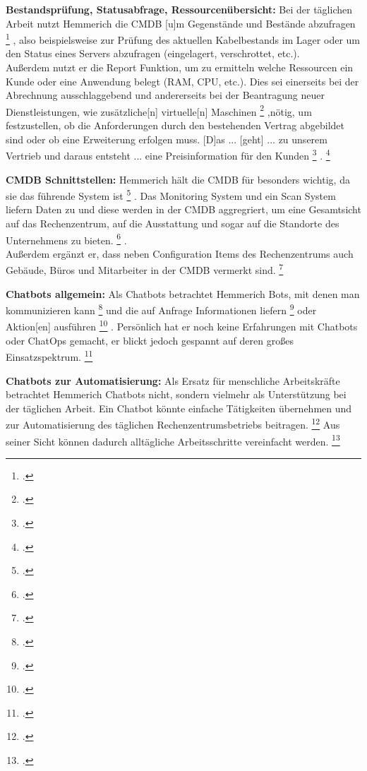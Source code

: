 \textbf{Bestandsprüfung, Statusabfrage, Ressourcenübersicht: }Bei der täglichen Arbeit nutzt Hemmerich die \acs{CMDB} \glqq{}[u]m Gegenstände und Bestände abzufragen\grqq
\footcite[][o. \pno]{Hemm_2019}
, also beispielsweise zur Prüfung des aktuellen Kabelbestands im Lager oder um den Status eines Servers abzufragen (eingelagert, verschrottet, etc.).\\
Außerdem nutzt er die Report Funktion, um zu ermitteln welche Ressourcen ein Kunde oder eine Anwendung belegt (RAM, CPU, etc.). Dies sei einerseits bei der Abrechnung ausschlaggebend und andererseits bei der Beantragung neuer Dienstleistungen, wie \glqq{}zusätzliche[n] virtuelle[n] Maschinen\grqq
\footcite[][o. \pno]{Hemm_2019}
,nötig, um festzustellen, ob die Anforderungen durch den bestehenden Vertrag abgebildet sind oder ob eine Erweiterung erfolgen muss. \glqq{}[D]as ... [geht] ... zu unserem Vertrieb und daraus entsteht ... eine Preisinformation für den Kunden\grqq
\footcite[][o. \pno]{Hemm_2019}
.
\footcite[Vgl.][o. \pno]{Hemm_2019}

\textbf{\acs{CMDB} Schnittstellen: }Hemmerich hält die \acs{CMDB} für besonders wichtig, da sie \glqq{}das führende System ist\grqq
\footcite[][o. \pno]{Hemm_2019}
. Das Monitoring System und ein Scan System liefern Daten zu und diese werden in der CMDB \glqq{}aggregriert, um eine Gesamtsicht auf das Rechenzentrum, auf die Ausstattung und sogar auf die Standorte des Unternehmens zu bieten.\grqq
\footcite[][o. \pno]{Hemm_2019}
.\\
Außerdem ergänzt er, dass neben Configuration Items des Rechenzentrums auch Gebäude, Büros und Mitarbeiter in der \acs{CMDB} vermerkt sind.
\footcite[Vgl.][o. \pno]{Hemm_2019}

\textbf{Chatbots allgemein: }Als Chatbots betrachtet Hemmerich Bots, \glqq{}mit denen man kommunizieren kann\grqq
\footcite[][o. \pno]{Hemm_2019}
und die auf Anfrage \glqq{}Informationen liefern\grqq
\footcite[][o. \pno]{Hemm_2019}
oder \glqq{}Aktion[en] ausführen\grqq
\footcite[][o. \pno]{Hemm_2019}
. Persönlich hat er noch keine Erfahrungen mit Chatbots oder ChatOps gemacht, er blickt jedoch gespannt auf deren großes Einsatzspektrum.
\footcite[Vgl.][o. \pno]{Hemm_2019}

\textbf{Chatbots zur Automatisierung: }Als Ersatz für menschliche Arbeitskräfte betrachtet Hemmerich Chatbots nicht, sondern vielmehr als Unterstützung bei der täglichen Arbeit. \glqq{}Ein Chatbot könnte einfache Tätigkeiten übernehmen und zur Automatisierung des täglichen Rechenzentrumsbetriebs beitragen.\grqq
\footcite[][o. \pno]{Hemm_2019}
Aus seiner Sicht können dadurch alltägliche Arbeitsschritte vereinfacht werden.
\footcite[Vgl.][o. \pno]{Hemm_2019}

